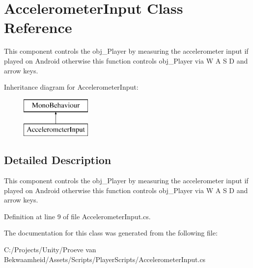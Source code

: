 \hypertarget{class_accelerometer_input}{\section{Accelerometer\+Input Class Reference}
\label{class_accelerometer_input}
}


This component controls the obj\+\_\+\+Player by measuring the accelerometer input if played on Android otherwise this function controls obj\+\_\+\+Player via W A S D and arrow keys.  


Inheritance diagram for Accelerometer\+Input\+:\begin{figure}[H]
\begin{center}
\leavevmode
\includegraphics[height=2.000000cm]{class_accelerometer_input}
\end{center}
\end{figure}


\subsection{Detailed Description}
This component controls the obj\+\_\+\+Player by measuring the accelerometer input if played on Android otherwise this function controls obj\+\_\+\+Player via W A S D and arrow keys. 



Definition at line 9 of file Accelerometer\+Input.\+cs.



The documentation for this class was generated from the following file\+:\begin{DoxyCompactItemize}
\item 
C\+:/\+Projects/\+Unity/\+Proeve van Bekwaamheid/\+Assets/\+Scripts/\+Player\+Scripts/Accelerometer\+Input.\+cs\end{DoxyCompactItemize}
